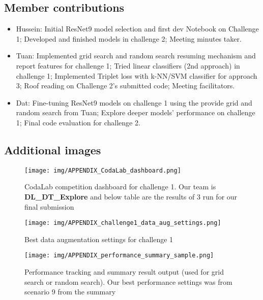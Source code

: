 \documentclass[10pt,twocolumn,letterpaper]{article}
\begin{document}
\subsection{Member contributions}
\begin{itemize}
 \item Hussein: Initial ResNet9 model selection and first dev Notebook on Challenge 1; Developed and finished models in challenge 2; Meeting minutes taker. 
 \item Tuan: Implemented grid search and random search resuming mechanism and report features for challenge 1; Tried linear classifiers (2nd approach) in challenge 1; Implemented Triplet loss with k-NN/SVM classifier for approach 3; Roof reading on Challenge 2's submitted code; Meeting facilitators. 
 \item Dat: Fine-tuning ResNet9 models on challenge 1 using the provide grid and random search from Tuan; Explore deeper models' performance on challenge 1; Final code evaluation for challenge 2. 
\end{itemize}

\subsection{Additional images}

\begin{figure}[h!]
   \centering
       \texttt{[image: img/APPENDIX\_CodaLab\_dashboard.png]}
   \caption{CodaLab competition dashboard for challenge 1. Our team is \textbf{DL\_DT\_Explore} and below table are the results of 3 run for our final submission\label{figure:CodaLab}}
 \end{figure}
 
 \begin{figure}[h!]
   \centering
       \texttt{[image: img/APPENDIX\_challenge1\_data\_aug\_settings.png]}
   \caption{Best data augmentation settings for challenge 1\label{figure:data_aug_setting_challenge1}}
 \end{figure}
 
 \begin{figure}[h!]
   \centering
       \texttt{[image: img/APPENDIX\_performance\_summary\_sample.png]}
   \caption{Performance tracking and summary result output (used for grid search or random search). Our best performance settings was from scenario 9 from the summary\label{figure:summary_track}}
 \end{figure}
\end{document}
